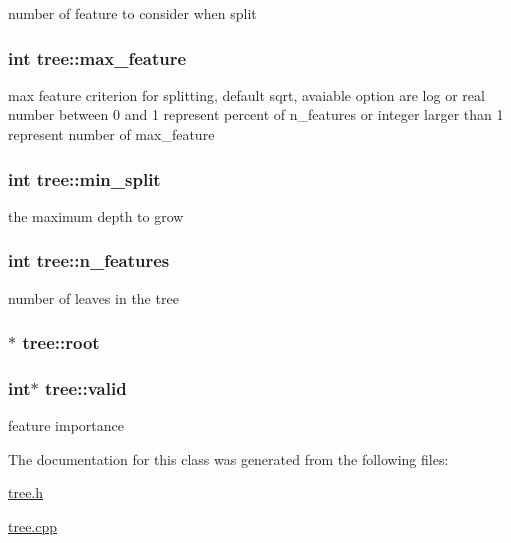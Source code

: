 number of feature to consider when split \hypertarget{classtree_a6f4304318f8f091f7d783ac1ec7d2775}{
\subsubsection[{max\+\_\+feature}]{\setlength{\rightskip}{0pt plus 5cm}int tree\+::max\+\_\+feature\hspace{0.3cm}{\ttfamily [protected]}}}\label{classtree_a6f4304318f8f091f7d783ac1ec7d2775}
max feature criterion for splitting, default {\ttfamily sqrt}, avaiable option are {\ttfamily log} or real number between 0 and 1 represent percent of {\ttfamily n\+\_\+features} or integer larger than 1 represent number of {\ttfamily max\+\_\+feature} \hypertarget{classtree_ae70cd626c0b50a0b8306a94a9e5e8fd7}{
\subsubsection[{min\+\_\+split}]{\setlength{\rightskip}{0pt plus 5cm}int tree\+::min\+\_\+split\hspace{0.3cm}{\ttfamily [protected]}}}\label{classtree_ae70cd626c0b50a0b8306a94a9e5e8fd7}
the maximum depth to grow \hypertarget{classtree_a48430ab4447259c35af5f22e894e1d6c}{
\subsubsection[{n\+\_\+features}]{\setlength{\rightskip}{0pt plus 5cm}int tree\+::n\+\_\+features\hspace{0.3cm}{\ttfamily [protected]}}}\label{classtree_a48430ab4447259c35af5f22e894e1d6c}
number of leaves in the tree \hypertarget{classtree_ad397d4906e47149b98f769b3e81473ee}{
\subsubsection[{root}]{$\ast$ tree\+::root\hspace{0.3cm}{\ttfamily [protected]}}}\label{classtree_ad397d4906e47149b98f769b3e81473ee}
\hypertarget{classtree_afa8e539406e1f8b373b147682e3a8196}{
\subsubsection[{valid}]{\setlength{\rightskip}{0pt plus 5cm}int$\ast$ tree\+::valid}}\label{classtree_afa8e539406e1f8b373b147682e3a8196}
feature importance 

The documentation for this class was generated from the following files\+:\begin{DoxyCompactItemize}
\item 
\hyperlink{tree_8h}{tree.\+h}\item 
\hyperlink{tree_8cpp}{tree.\+cpp}\end{DoxyCompactItemize}
